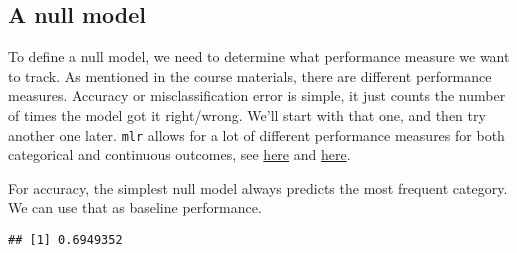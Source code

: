\documentclass[]{article}
\newenvironment{Shaded}{\begin{snugshade}}{\end{snugshade}}
\newcommand{\CommentTok}[1]{\textcolor[rgb]{0.56,0.35,0.01}{\textit{#1}}}
\newcommand{\DataTypeTok}[1]{\textcolor[rgb]{0.13,0.29,0.53}{#1}}
\newcommand{\DecValTok}[1]{\textcolor[rgb]{0.00,0.00,0.81}{#1}}
\newcommand{\KeywordTok}[1]{\textcolor[rgb]{0.13,0.29,0.53}{\textbf{#1}}}
\newcommand{\NormalTok}[1]{#1}
\newcommand{\OperatorTok}[1]{\textcolor[rgb]{0.81,0.36,0.00}{\textbf{#1}}}
\newcommand{\StringTok}[1]{\textcolor[rgb]{0.31,0.60,0.02}{#1}}
\begin{document}
\begin{Shaded}
\end{Shaded}

\hypertarget{a-null-model}{%
\subsection{A null model}\label{a-null-model}}

To define a null model, we need to determine what performance measure we
want to track. As mentioned in the course materials, there are different
performance measures. Accuracy or misclassification error is simple, it
just counts the number of times the model got it right/wrong. We'll
start with that one, and then try another one later. \texttt{mlr} allows
for a lot of different performance measures for both categorical and
continuous outcomes, see
\href{https://mlr.mlr-org.com/articles/tutorial/performance.html}{here}
and
\href{https://mlr.mlr-org.com/articles/tutorial/measures.html}{here}.

For accuracy, the simplest null model always predicts the most frequent
category. We can use that as baseline performance.

\begin{Shaded}
\end{Shaded}

\begin{verbatim}
## [1] 0.6949352
\end{verbatim}
\end{document}
